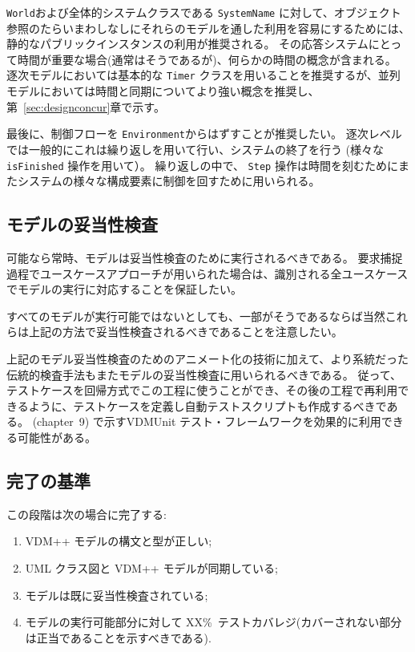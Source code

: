 \documentclass[\pformat,12pt]{jreport}
\begin{document}
 \texttt{World}および全体的システムクラスである \texttt{SystemName} に対して、オブジェクト参照のたらいまわしなしにそれらのモデルを通した利用を容易にするためには、静的なパブリックインスタンスの利用が推奨される。
その応答システムにとって時間が重要な場合(通常はそうであるが)、何らかの時間の概念が含まれる。
逐次モデルにおいては基本的な \texttt{Timer} クラスを用いることを推奨するが、並列モデルにおいては時間と同期についてより強い概念を推奨し、第~\ref{sec:designconcur}章で示す。

最後に、制御フローを \texttt{Environment}からはずすことが推奨したい。
逐次レベルでは一般的にこれは繰り返しを用いて行い、システムの終了を行う (様々な \texttt{isFinished} 操作を用いて）。
繰り返しの中で、 \texttt{Step} 操作は時間を刻むためにまたシステムの様々な構成要素に制御を回すために用いられる。

\subsection{モデルの妥当性検査}

可能なら常時、モデルは妥当性検査のために実行されるべきである。
要求捕捉過程でユースケースアプローチが用いられた場合は、識別される全ユースケースでモデルの実行に対応することを保証したい。

すべてのモデルが実行可能ではないとしても、一部がそうであるならば当然これらは上記の方法で妥当性検査されるべきであることを注意したい。

上記のモデル妥当性検査のためのアニメート化の技術に加えて、より系統だった伝統的検査手法もまたモデルの妥当性検査に用いられるべきである。
従って、テストケースを回帰方式でこの工程に使うことができ、その後の工程で再利用できるように、テストケースを定義し自動テストスクリプトも作成するべきである。
\cite{Fitzgerald&05} (chapter~9) で示すVDMUnit テスト・フレームワークを効果的に利用できる可能性がある。

\subsection{完了の基準}

この段階は次の場合に完了する:

\begin{enumerate}
\item  VDM++ モデルの構文と型が正しい;
\item  UML クラス図と VDM++ モデルが同期している;
\item  モデルは既に妥当性検査されている;
\item モデルの実行可能部分に対して XX\%\ テストカバレジ(カバーされない部分は正当であることを示すべきである).
\end{enumerate}
\end{document}

